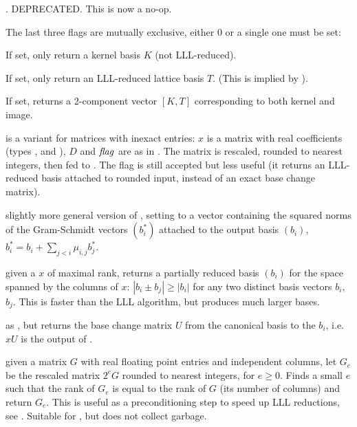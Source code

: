 \item  {}. DEPRECATED. This is now a no-op.

The last three flags are mutually exclusive, either 0 or a single one must be
set:

\item  {} If set, only return a kernel basis $K$ (not LLL-reduced).

\item  {} If set, only return an LLL-reduced lattice basis $T$.
(This is implied by ).

\item  {} If set, returns a 2-component vector $[K, T]$
corresponding to both kernel and image.


 is a variant for matrices
with inexact entries: $x$ is a matrix with real coefficients (types
,  and ), $D$ and $\hbox{\it f\kern0pt lag\/}$ are as in .
The matrix is rescaled, rounded to nearest integers, then fed to
. The flag  is still accepted but less useful
(it returns an LLL-reduced basis attached to rounded input, instead of an
exact base change matrix).

 slightly more
general version of , setting  to a vector containing
the squared norms of the Gram-Schmidt vectors $(b_i^*)$ attached to the
output basis $(b_i)$, $b_i^* = b_i + \sum_{j < i} \mu_{i,j} b_j^*$.

 given a  $x$ of maximal rank,
returns a partially reduced basis $(b_i)$ for the space spanned by the
columns of $x$: $|b_i \pm b_j| \geq |b_i|$ for any two distinct basis vectors
$b_i$, $b_j$. This is faster than the LLL algorithm, but produces much larger
bases.

 as , but returns
the base change matrix $U$ from the canonical basis to the $b_i$, i.e. $x U$
is the output of .

 given a matrix $G$ with real floating
point entries and independent columns, let $G_e$ be the
rescaled matrix $2^e G$ rounded to nearest integers, for $e \geq 0$.
Finds a small $e$ such that the rank of $G_e$ is equal to the rank of $G$
(its number of columns) and return $G_e$. This is useful as a preconditioning
step to speed up LLL reductions, see .
Suitable for , but does not collect garbage.


